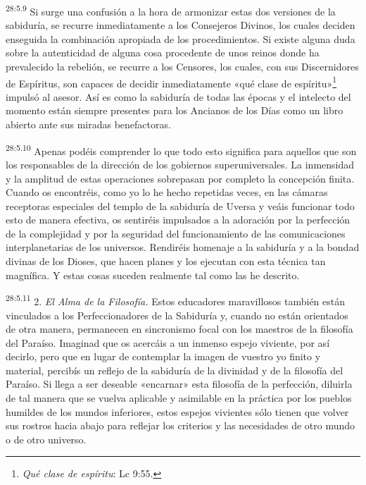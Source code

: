 \par
\textsuperscript{28:5.9} Si surge una confusión a la hora de armonizar estas dos versiones de la sabiduría, se recurre inmediatamente a los Consejeros Divinos, los cuales deciden enseguida la combinación apropiada de los procedimientos. Si existe alguna duda sobre la autenticidad de alguna cosa procedente de unos reinos donde ha prevalecido la rebelión, se recurre a los Censores, los cuales, con sus Discernidores de Espíritus, son capaces de decidir inmediatamente «qué clase de espíritu»\footnote{\textit{Qué clase de espíritu}: Lc 9:55.} impulsó al asesor. Así es como la sabiduría de todas las épocas y el intelecto del momento están siempre presentes para los Ancianos de los Días como un libro abierto ante sus miradas benefactoras.

\par
\textsuperscript{28:5.10} Apenas podéis comprender lo que todo esto significa para aquellos que son los responsables de la dirección de los gobiernos superuniversales. La inmensidad y la amplitud de estas operaciones sobrepasan por completo la concepción finita. Cuando os encontréis, como yo lo he hecho repetidas veces, en las cámaras receptoras especiales del templo de la sabiduría de Uversa y veáis funcionar todo esto de manera efectiva, os sentiréis impulsados a la adoración por la perfección de la complejidad y por la seguridad del funcionamiento de las comunicaciones interplanetarias de los universos. Rendiréis homenaje a la sabiduría y a la bondad divinas de los Dioses, que hacen planes y los ejecutan con esta técnica tan magnífica. Y estas cosas suceden realmente tal como las he descrito.

\par
\textsuperscript{28:5.11} 2. \textit{El Alma de la Filosofía.} Estos educadores maravillosos también están vinculados a los Perfeccionadores de la Sabiduría y, cuando no están orientados de otra manera, permanecen en sincronismo focal con los maestros de la filosofía del Paraíso. Imaginad que os acercáis a un inmenso espejo viviente, por así decirlo, pero que en lugar de contemplar la imagen de vuestro yo finito y material, percibís un reflejo de la sabiduría de la divinidad y de la filosofía del Paraíso. Si llega a ser deseable «encarnar» esta filosofía de la perfección, diluirla de tal manera que se vuelva aplicable y asimilable en la práctica por los pueblos humildes de los mundos inferiores, estos espejos vivientes sólo tienen que volver sus rostros hacia abajo para reflejar los criterios y las necesidades de otro mundo o de otro universo.

